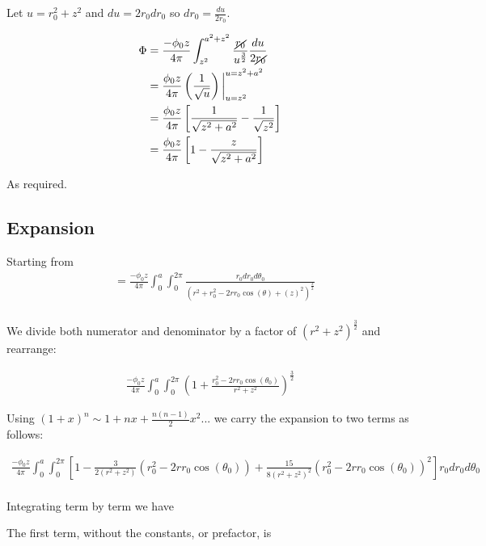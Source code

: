 \documentclass[paper=a4, fontsize=11pt]{scrartcl} %
\numberwithin{equation}{section} %
\numberwithin{figure}{section} %
\numberwithin{table}{section} %
\begin{document}
Let $u = r_0^2 + z^2$ and $du = 2r_0dr_0$ so $dr_0 = \frac{du}{2r_0}$.

\begin{align}
\Phi &= \frac{-\phi_0 z}{4 \pi}\int_{z^2}^{a^2 + z^2}\frac{\cancel{r_0}}{u^{\frac{3}{2}}}\frac{du}{2\cancel{r_0}} \\
&= \frac{\phi_0 z}{4 \pi} \left(\frac{1}{\sqrt{u}}\right)\bigg|_{u=z^2}^{u=z^2 + a^2} \\
&= \frac{\phi_0 z}{4 \pi} \left[\frac{1}{\sqrt{z^2 + a^2}} - \frac{1}{\sqrt{z^2}}\right] \\
&= \frac{\phi_0 z}{4 \pi} \left[ 1 - \frac{z}{\sqrt{z^2 + a^2}}\right]\\
\end{align}

As required.

\subsection{Expansion}

Starting from
\begin{align}
&= \frac{-\phi_0z}{4 \pi} \int_0^a \int_0^{2 \pi} \frac{r_0dr_0d\theta_0}{\left(r^2 + r_0^2 - 2 r r_0 \cos(\theta) + (z)^2\right)^{\frac{3}{2}}}  \\
\end{align}

We divide both numerator and denominator by a factor of $(r^2 + z^2)^{\frac{3}{2}}$ and rearrange:

\begin{align}
\frac{-\phi_0 z}{4 \pi} \int_0^a \int_0^{2\pi}\left(1 + \frac{r_0^2 -2 r r_0 \cos(\theta_0)}{r^2 + z^2}\right)^{\frac{3}{2}}
\end{align}

Using $(1 + x)^n \sim 1 + nx + \frac{n(n-1)}{2}x^2...$ we carry the expansion to two terms as follows:

\begin{align}
\frac{-\phi_0 z}{4 \pi}\int_0^a \int_0^{2 \pi}\left[1 - \frac{3}{2(r^2 + z^2)}(r_0^2 - 2rr_0\cos(\theta_0)) + \frac{15}{8(r^2 + z^2)^2}(r_0^2 - 2rr_0\cos(\theta_0))^2\right]r_0 dr_0 d\theta_0 \\
\end{align}

Integrating term by term we have 

The first term, without the constants, or prefactor, is
\end{document}
